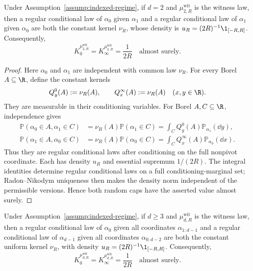 \begin{proposition}
\label{prop:degree-two-witness-kernels}
Under Assumption~\ref{assump:indexed-regime}, if $d=2$ and
$\mu^{\mathrm{wit}}_{2,R}$ is the witness law, then a regular conditional
law of $\alpha_0$ given $\alpha_1$ and a regular conditional law of
$\alpha_1$ given $\alpha_0$ are both the constant kernel $\nu_R$, whose
density is $u_R=(2R)^{-1}\1_{[-R,R]}$.  Consequently,
\[
K_0^{\mu^{\mathrm{wit}}_{2,R}}
=K_\infty^{\mu^{\mathrm{wit}}_{2,R}}
=\frac1{2R}
\quad\text{almost surely}.
\]
\end{proposition}

\begin{proof}
Here $\alpha_0$ and $\alpha_1$ are independent with common law $\nu_R$.
For every Borel $A\subseteq\R$, define the constant kernels
\[
Q^0_y(A):=\nu_R(A),\qquad Q^\infty_x(A):=\nu_R(A)
\quad(x,y\in\R).
\]
They are measurable in their conditioning variables.  For Borel
$A,C\subseteq\R$, independence gives
\[
\begin{aligned}
\mathbb P(\alpha_0\in A,\alpha_1\in C)
&=\nu_R(A)\mathbb P(\alpha_1\in C)
=\int_CQ^0_y(A)\mathbb P_{\alpha_1}(\dd y),\\
\mathbb P(\alpha_1\in A,\alpha_0\in C)
&=\nu_R(A)\mathbb P(\alpha_0\in C)
=\int_CQ^\infty_x(A)\mathbb P_{\alpha_0}(\dd x).
\end{aligned}
\]
Thus they are regular conditional laws after conditioning on the full
nonpivot coordinate.  Each has density $u_R$ and essential supremum
$1/(2R)$.  The integral identities determine regular conditional laws on a
full conditioning-marginal set; Radon--Nikodym uniqueness then makes the
density norm independent of the permissible versions.  Hence both random
caps have the asserted value almost surely.
\end{proof}

\begin{proposition}
\label{prop:higher-degree-witness-kernels}
Under Assumption~\ref{assump:indexed-regime}, if $d\geq3$ and
$\mu^{\mathrm{wit}}_{d,R}$ is the witness law, then a regular conditional
law of $\alpha_0$ given all coordinates $\alpha_{1:d-1}$ and a regular
conditional law of $\alpha_{d-1}$ given all coordinates
$\alpha_{0:d-2}$ are both the constant uniform kernel $\nu_R$, with density
$u_R=(2R)^{-1}\1_{[-R,R]}$.  Consequently,
\[
K_0^{\mu^{\mathrm{wit}}_{d,R}}
=K_\infty^{\mu^{\mathrm{wit}}_{d,R}}
=\frac1{2R}
\quad\text{almost surely}.
\]
\end{proposition}

